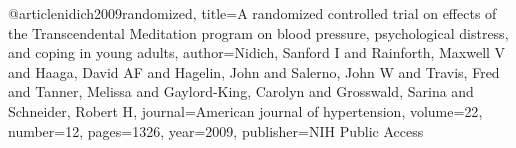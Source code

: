 @article{nidich2009randomized,
  title={A randomized controlled trial on effects of the Transcendental Meditation program on blood pressure, psychological distress, and coping in young adults},
  author={Nidich, Sanford I and Rainforth, Maxwell V and Haaga, David AF and Hagelin, John and Salerno, John W and Travis, Fred and Tanner, Melissa and Gaylord-King, Carolyn and Grosswald, Sarina and Schneider, Robert H},
  journal={American journal of hypertension},
  volume={22},
  number={12},
  pages={1326},
  year={2009},
  publisher={NIH Public Access}
}